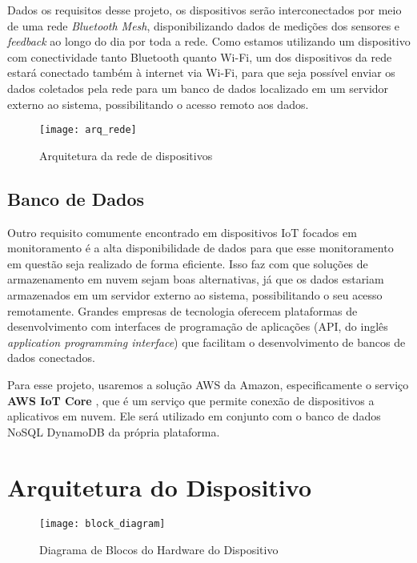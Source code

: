 \documentclass[../monografia.tex]{subfiles}
\begin{document}
Dados os requisitos desse projeto, os dispositivos serão interconectados por meio de uma rede \textit{Bluetooth Mesh}, disponibilizando dados de medições dos sensores e \textit{feedback} ao longo do dia por toda a rede. Como estamos utilizando um dispositivo com conectividade tanto Bluetooth quanto Wi-Fi, um dos dispositivos da rede estará conectado também à internet via Wi-Fi, para que seja possível enviar os dados coletados pela rede para um banco de dados localizado em um servidor externo ao sistema, possibilitando o acesso remoto aos dados.

\begin{figure}[h!]
    \texttt{[image: arq\_rede]}
    \caption{Arquitetura da rede de dispositivos}
    \label{fig:Diagrama de Blocos}
\end{figure}

\subsection{Banco de Dados}
Outro requisito comumente encontrado em dispositivos IoT focados em monitoramento é a alta disponibilidade de dados para que esse monitoramento em questão seja realizado de forma eficiente. Isso faz com que soluções de armazenamento em nuvem sejam boas alternativas, já que os dados estariam armazenados em um servidor externo ao sistema, possibilitando o seu acesso remotamente. Grandes empresas de tecnologia oferecem plataformas de desenvolvimento com interfaces de programação de aplicações (API, do inglês \textit{application programming interface}) que facilitam o desenvolvimento de bancos de dados conectados.

Para esse projeto, usaremos a solução AWS da Amazon, especificamente o serviço \textbf{AWS IoT Core} \cite{aws-iot}, que é um serviço que permite conexão de dispositivos a aplicativos em nuvem. Ele será utilizado em conjunto com o banco de dados NoSQL DynamoDB da própria plataforma.


\section{Arquitetura do Dispositivo} %

\begin{figure}[h!]
    \texttt{[image: block\_diagram]}
    \caption{Diagrama de Blocos do Hardware do Dispositivo}
    \label{fig:Diagrama de Blocos}
\end{figure}
\end{document}
